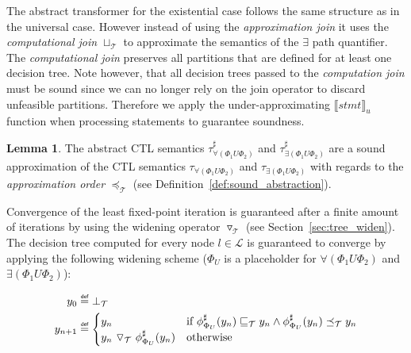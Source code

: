 \documentclass[11pt,a4paper,titlepage]{article}
\theoremstyle{definition}
\newtheorem{lemma}[theorem]{Lemma}
\newcommand\eqdef{\mathrel{\overset{\makebox[0pt]{\mbox{\normalfont\tiny\sffamily def}}}{=}}}
\begin{document}
The abstract transformer for the existential case follows the same structure as in the universal case. 
However instead of using the \textit{approximation join} it uses the \textit{computational join} $\sqcup_\mathcal{T}$ 
to approximate the semantics of the $\exists$ path quantifier. 
The \textit{computational join} preserves all partitions that are defined for at least one decision tree. 
Note however, that all decision trees passed to the \textit{computation join} must be sound since we can no longer 
rely on the join operator to discard unfeasible partitions. Therefore we apply the under-approximating ${\llbracket stmt \rrbracket}_{u}$ 
function when processing statements to guarantee soundness.\\

\begin{lemma}
    The abstract CTL semantics 
    $\tau^{\sharp}_{\forall(\Phi_1 U \Phi_2)}$ and $\tau^{\sharp}_{\exists(\Phi_1 U \Phi_2)}$
    are a sound approximation of the CTL semantics
    $\tau_{\forall(\Phi_1 U \Phi_2)}$ and $\tau_{\exists(\Phi_1 U \Phi_2)}$
    with regards to the \textit{approximation order} $\preceq_\mathcal{T}$ (see Definition~\ref{def:sound_abstraction}).\\
\end{lemma}

Convergence of the least fixed-point iteration is guaranteed after a finite amount of iterations by using the widening operator $\triangledown_\mathcal{T}$ 
(see Section~\ref{sec:tree_widen}). The decision tree computed for every node $l \in \mathcal{L}$ is guaranteed to converge by applying the following widening scheme 
($\Phi_U$ is a placeholder for $\forall(\Phi_1 U \Phi_2)$ and $\exists(\Phi_1 U \Phi_2)$):

\begin{align*}
    y_0 &\eqdef \bot_\mathcal{T}\\
    y_{n+1} &\eqdef 
    \begin{cases}
        y_n                   &\text{if} \ \phi^\sharp_{\Phi_{U}}(y_n) \sqsubseteq_\mathcal{T} y_n 
        \land \phi^\sharp_{\Phi_U}(y_n) \preceq_\mathcal{T} y_n  \\
        y_n \ \triangledown_\mathcal{T} \ \phi^\sharp_{\Phi_U}(y_n)     &\text{otherwise}
    \end{cases}
\end{align*}
\end{document}
